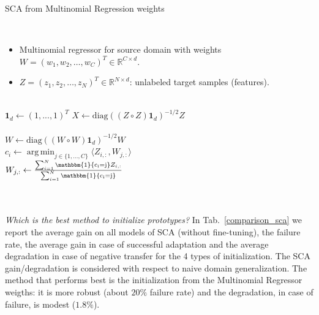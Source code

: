 \documentclass{article}
\DeclareMathOperator*{\argmin}{arg\,min}
\begin{document}
\begin{algorithm}
\label{clust_alg}
\caption{SCA from Multinomial Regression weights}\label{alg:cap}
\begin{algorithmic}

\Require \\
\begin{itemize}
\item Multinomial regressor for source domain with weights $W = (w_1, w_2, \ldots, w_C)^T \in \mathbb{R}^{C \times d}$.
\item $Z = (z_1, z_2, \ldots, z_N)^T \in \mathbb{R}^{N \times d}$: unlabeled target samples (features).
\end{itemize}
\\
\State $\mathbf{1}_d \gets (1, ..., 1)^T$
\State $X \gets \text{diag}((Z \circ Z)\mathbf{1}_d)^{-1/2}Z$ 
\\
\\
\State $W \gets \text{diag}((W \circ W)\mathbf{1}_d)^{-1/2}W$ 
\\

 
    \State $c_i \gets \argmin_{j \in \{1, \ldots, C \}} \langle Z_{i, :} , W_{j, :} \rangle$
\EndFor
\\

 
    \State $W_{j,:} \gets \frac{\sum_{i=1}^{N} \mathbbm{1}\mathrm{\{c_i = j\}}Z_{i,:}}{\sum_{i=1}^{N} \mathbbm{1}\mathrm{\{c_i = j\}}} $
\EndFor
\\
\EndWhile
\\
\\

\end{algorithmic}
\end{algorithm}

\textit{Which is the best method to initialize prototypes?}
In Tab.~\ref{comparison_sca} we report the average gain on all models of SCA (without fine-tuning), the failure rate, the average gain in case of successful adaptation and the average degradation in case of negative transfer for the 4 types of initialization.  The SCA gain/degradation is considered with respect to naive domain generalization.
The method that performs best is the initialization from the Multinomial Regressor weigths: it is more robust (about $20\%$ failure rate) and the degradation, in case of failure, is modest ($1.8\%$).
\end{document}
